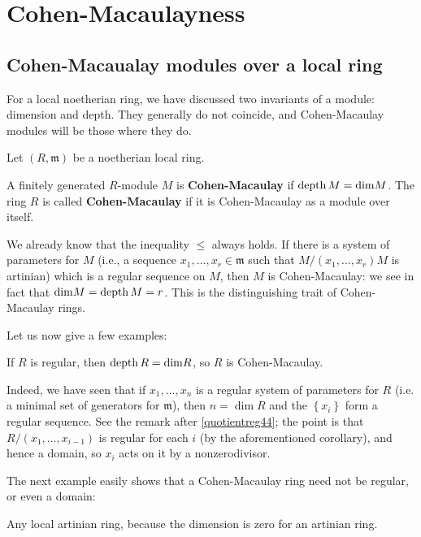 \section{Cohen-Macaulayness}

\subsection{Cohen-Macaualay modules over a local ring}
For a local noetherian ring, we have discussed two invariants of a module:
dimension and depth. They generally do not coincide, and Cohen-Macaulay
modules will be those where they do.

Let $(R, \mathfrak{m})$ be a noetherian local ring.
\begin{definition} 
A finitely generated $R$-module $M$ is \textbf{Cohen-Macaulay} if $\operatorname{depth} M =
\mathrm{dim} M$. The ring $R$ is called \textbf{Cohen-Macaulay} if it is
Cohen-Macaulay as a module over itself.
\end{definition} 

We already know that the inequality $\leq$ always holds. 
If there is a system of parameters for $M$ (i.e., a sequence $x_1, \dots, x_r
\in \mathfrak{m}$ such that $M/(x_1, \dots, x_r) M$ is artinian) which is a
regular sequence on $M$, then $M$ is Cohen-Macaulay: we see in fact that
$\mathrm{dim} M  = \operatorname{depth} M = r$.
This is the distinguishing trait of Cohen-Macaulay rings.

Let us now give a few examples:

\begin{example}
If $R$ is regular, then $\operatorname{depth} R = \mathrm{dim} R$, so $R$ is Cohen-Macaulay.

Indeed, we have seen that if $x_1, \dots, x_n$ is a regular system of parameters
for $R$ (i.e. a minimal set of generators for $\mathfrak{m}$), then $n
= \dim R$ and the $\left\{x_i\right\}$ form a regular sequence. See the remark
after \cref{quotientreg44}; the point is that $R/(x_1, \dots, x_{i-1})$ is
regular for each $i$ (by the aforementioned corollary), and hence a
domain, so $x_i$
acts on it by a nonzerodivisor.
\end{example}

The next example easily shows that a Cohen-Macaulay ring need not be
regular, or even a domain:
\begin{example}
Any local
artinian ring, because the dimension is zero for an artinian
ring. 
\end{example}


